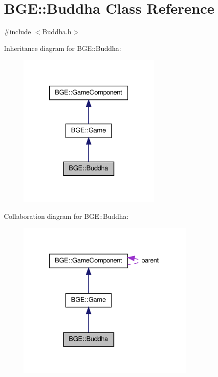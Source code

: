 \hypertarget{class_b_g_e_1_1_buddha}{\section{B\-G\-E\-:\-:Buddha Class Reference}
\label{class_b_g_e_1_1_buddha}
}


{\ttfamily \#include $<$Buddha.\-h$>$}



Inheritance diagram for B\-G\-E\-:\-:Buddha\-:
\nopagebreak
\begin{figure}[H]
\begin{center}
\leavevmode
\includegraphics[width=200pt]{class_b_g_e_1_1_buddha__inherit__graph}
\end{center}
\end{figure}


Collaboration diagram for B\-G\-E\-:\-:Buddha\-:
\nopagebreak
\begin{figure}[H]
\begin{center}
\leavevmode
\includegraphics[width=249pt]{class_b_g_e_1_1_buddha__coll__graph}
\end{center}
\end{figure}
